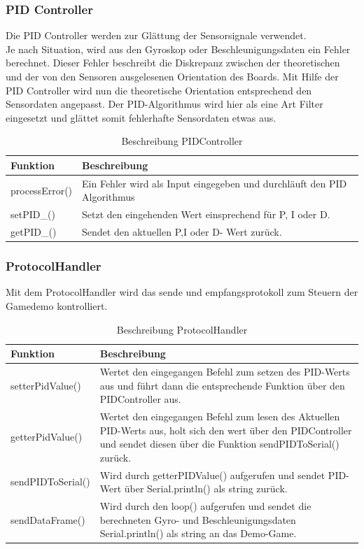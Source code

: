 \subsubsection{PID Controller}
Die PID Controller werden zur Glättung der Sensorsignale verwendet.\\
Je nach Situation, wird aus den Gyroskop oder Beschleunigungsdaten ein Fehler berechnet. 
Dieser Fehler beschreibt die Diskrepanz zwischen der theoretischen und der von den Sensoren ausgelesenen Orientation des Boards.
Mit Hilfe der PID Controller wird nun die theoretische Orientation entsprechend den Sensordaten angepasst.
Der PID-Algorithmus wird hier als eine Art Filter eingesetzt und glättet somit fehlerhafte Sensordaten etwas aus.\
\begin{table}[H]
  \centering
  \settowidth{}
  \setlength\extrarowheight{2pt}
  \begin{tabulary}{1.0\textwidth}{|L|L|}
    \hline
    \textbf{Funktion} &
    \textbf{Beschreibung}\\
    \hline
    processError() & Ein Fehler wird als Input eingegeben und durchläuft den PID Algorithmus\\
    \hline
    setPID\_() & Setzt den eingehenden Wert einsprechend für P, I oder D. \\
    \hline
    getPID\_() & Sendet den aktuellen P,I oder D- Wert zurück.\\
    \hline
  \end{tabulary}
  \caption{Beschreibung PIDController}
\end{table}


\subsubsection{ProtocolHandler}
Mit dem ProtocolHandler wird das sende und empfangsprotokoll zum Steuern der Gamedemo kontrolliert.
\begin{table}[H]
  \centering
  \settowidth{}
  \setlength\extrarowheight{2pt}
  \begin{tabulary}{1.0\textwidth}{|L|L|}
    \hline
    \textbf{Funktion} &
    \textbf{Beschreibung}\\
    \hline
    setterPidValue() &
    Wertet den eingegangen Befehl zum setzen des PID-Werts aus und führt dann die entsprechende Funktion über den PIDController aus. \\
    \hline
    getterPidValue() &
    Wertet den eingegangen Befehl zum lesen des Aktuellen PID-Werts aus, holt sich den wert über den PIDController und sendet diesen über die Funktion sendPIDToSerial() zurück.\\
    \hline
    sendPIDToSerial() & 
    Wird durch getterPIDValue() aufgerufen und sendet PID-Wert über Serial.println() als string zurück.\\
    \hline
    sendDataFrame() &
    Wird durch den loop() aufgerufen und sendet die berechneten Gyro- und Beschleunigungsdaten Serial.println() als string an das Demo-Game.\\
    \hline
  \end{tabulary}
  \caption{Beschreibung ProtocolHandler}
\end{table}

\newpage